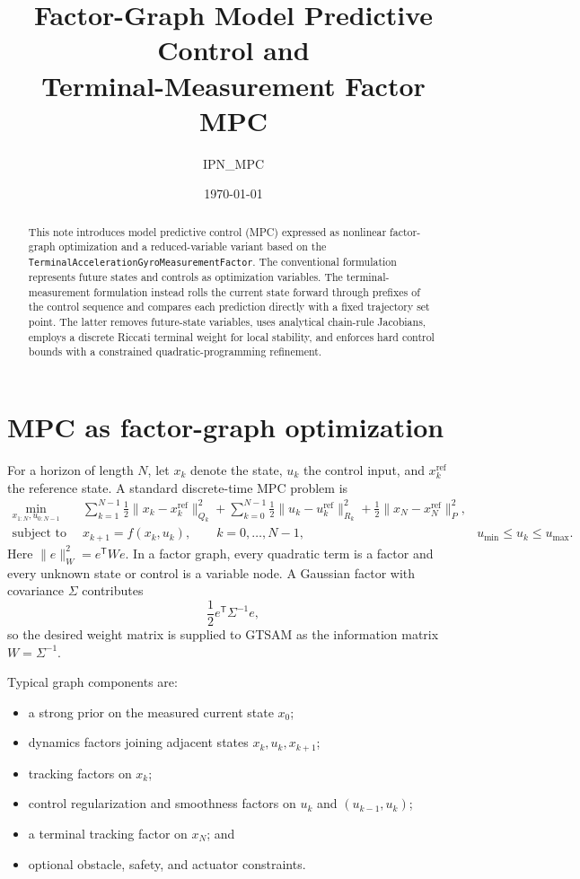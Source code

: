 \documentclass[11pt]{article}
\title{Factor-Graph Model Predictive Control and\\
Terminal-Measurement Factor MPC}
\author{IPN\_MPC}
\date{\today}
\newcommand{\transpose}{\mathsf{T}}
\begin{document}
\maketitle

\begin{abstract}
This note introduces model predictive control (MPC) expressed as nonlinear factor-graph
optimization and a reduced-variable variant based on the
\texttt{TerminalAccelerationGyroMeasurementFactor}.  The conventional formulation represents
future states and controls as optimization variables.  The terminal-measurement formulation
instead rolls the current state forward through prefixes of the control sequence and compares each
prediction directly with a fixed trajectory set point.  The latter removes future-state variables,
uses analytical chain-rule Jacobians, employs a discrete Riccati terminal weight for local
stability, and enforces hard control bounds with a constrained quadratic-programming refinement.
\end{abstract}

\section{MPC as factor-graph optimization}

For a horizon of length $N$, let $x_k$ denote the state, $u_k$ the control input, and
$x_k^{\mathrm{ref}}$ the reference state.  A standard discrete-time MPC problem is
\begin{align}
\min_{x_{1:N},u_{0:N-1}}\quad
& \sum_{k=1}^{N-1}\frac{1}{2}
  \lVert x_k-x_k^{\mathrm{ref}}\rVert_{Q_k}^{2}
  +\sum_{k=0}^{N-1}\frac{1}{2}\lVert u_k-u_k^{\mathrm{ref}}\rVert_{R_k}^{2}
  +\frac{1}{2}\lVert x_N-x_N^{\mathrm{ref}}\rVert_{P}^{2},
\label{eq:standard-mpc-cost}\\
\text{subject to}\quad
&x_{k+1}=f(x_k,u_k),\qquad k=0,\ldots,N-1,\label{eq:dynamics}\
&u_{\min}\leq u_k\leq u_{\max}.\label{eq:bounds}
\end{align}
Here $\lVert e\rVert_W^2=e^\transpose W e$.  In a factor graph, every quadratic term is a
factor and every unknown state or control is a variable node.  A Gaussian factor with covariance
$\Sigma$ contributes
\begin{equation}
\frac{1}{2}e^\transpose\Sigma^{-1}e,
\end{equation}
so the desired weight matrix is supplied to GTSAM as the information matrix
$W=\Sigma^{-1}$.

Typical graph components are:
\begin{itemize}
  \item a strong prior on the measured current state $x_0$;
  \item dynamics factors joining adjacent states $x_k,u_k,x_{k+1}$;
  \item tracking factors on $x_k$;
  \item control regularization and smoothness factors on $u_k$ and $(u_{k-1},u_k)$;
  \item a terminal tracking factor on $x_N$; and
  \item optional obstacle, safety, and actuator constraints.
\end{itemize}
\end{document}
